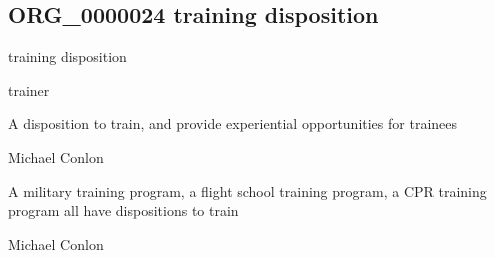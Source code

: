 \documentclass[letterpaper,10pt,english]{sphinxmanual}
\begin{document}
\subsection{ORG\_0000024 \sphinxhyphen{} training disposition}
\label{\detokenize{doc-ORG_0000024:org-0000024-training-disposition}}\label{\detokenize{doc-ORG_0000024:index-0}}\label{\detokenize{doc-ORG_0000024::doc}}
\begin{sphinxShadowBox}

\sphinxAtStartPar
training disposition
\end{sphinxShadowBox}

\begin{sphinxShadowBox}

\sphinxAtStartPar
trainer
\end{sphinxShadowBox}

\begin{sphinxShadowBox}

\sphinxAtStartPar
{\hyperref[\detokenize{doc-BFO_0000016::doc}]{}}
\end{sphinxShadowBox}

\begin{sphinxShadowBox}

\sphinxAtStartPar
A disposition to train, and provide experiential opportunities for trainees
\end{sphinxShadowBox}

\begin{sphinxShadowBox}

\sphinxAtStartPar
Michael Conlon 
\end{sphinxShadowBox}

\begin{sphinxShadowBox}

\sphinxAtStartPar
A military training program, a flight school training program, a CPR training program all have dispositions to train
\end{sphinxShadowBox}

\begin{sphinxShadowBox}

\sphinxAtStartPar
Michael Conlon 
\end{sphinxShadowBox}
\begin{quote}

\ignorespaces \end{quote}
\end{document}
